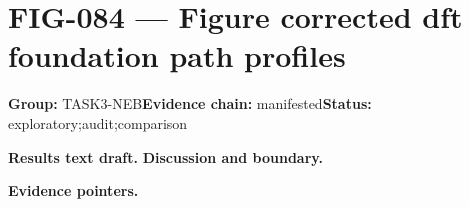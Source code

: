 \clearpage
\section{FIG-084 --- Figure corrected dft foundation path profiles}
\label{figpage:fig-084}
\textbf{Group:} TASK3-NEB\quad \textbf{Evidence chain:} manifested\quad \textbf{Status:} exploratory;audit;comparison

\textbf{Results text draft.} 
\textbf{Discussion and boundary.} 


\textbf{Evidence pointers.}



\vfill
